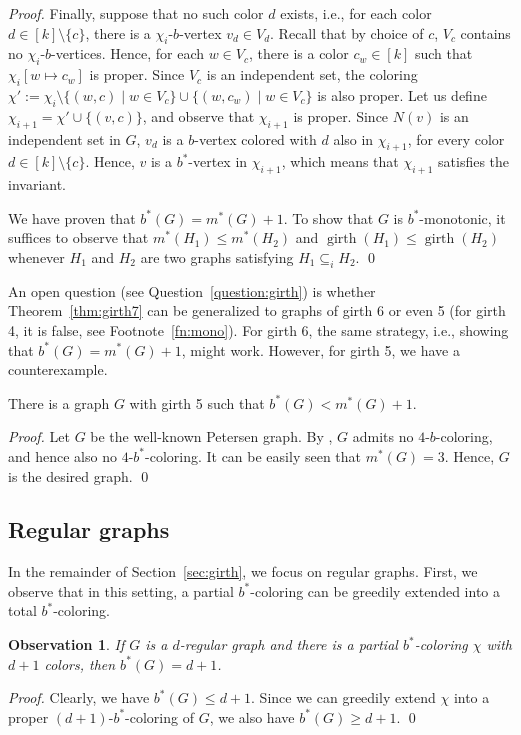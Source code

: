 \documentclass[runningheads, envcountsame]{llncs}
\newcommand{\sep}{\;|\;}
\newcommand{\seq}{\subseteq}
\newtheorem{observation}[theorem]{Observation}
\DeclareMathOperator{\girth}{girth}
\begin{document}
\begin{proof}
Finally, suppose that no such color $d$ exists, i.e., for each color $d \in [k] \setminus \{c\}$, there is a $\chi_i$-$b$-vertex $v_d \in V_d$.
Recall that by choice of $c$, $V_c$ contains no $\chi_i$-$b$-vertices.
Hence, for each $w \in V_c$, there is a color $c_w \in [k]$ such that $\chi_i[w \mapsto c_w]$ is proper.
Since $V_c$ is an independent set, the coloring $\chi' := \chi_i \setminus \{(w, c) \sep w \in V_c\} \cup \{(w, c_w) \sep w \in V_c\}$ is also proper.
Let us define $\chi_{i+1} = \chi' \cup \{(v, c)\}$, and observe that $\chi_{i+1}$ is proper.
Since $N(v)$ is an independent set in $G$, $v_d$ is a $b$-vertex colored with $d$ also in $\chi_{i+1}$, for every color $d \in [k] \setminus \{c\}$.
Hence, $v$ is a $b^*$-vertex in $\chi_{i+1}$, which means that $\chi_{i+1}$ satisfies the invariant.

We have proven that $b^*(G) = m^*(G) + 1$.
To show that $G$ is $b^*$-monotonic, it suffices to observe that $m^*(H_1) \le m^*(H_2)$ and $\girth(H_1) \le \girth(H_2)$ whenever $H_1$ and $H_2$ are two graphs satisfying $H_1 \seq_i H_2$.
\qed\end{proof}

An open question (see Question~\ref{question:girth}) is whether Theorem~\ref{thm:girth7} can be generalized to graphs of girth 6 or even 5 (for girth 4, it is false, see Footnote~\ref{fn:mono}).
For girth 6, the same strategy, i.e., showing that $b^*(G) = m^*(G) + 1$, might work.
However, for girth 5, we have a counterexample.

\begin{proposition}
There is a graph $G$ with girth 5 such that $b^*(G) < m^*(G) + 1$.
\end{proposition}
\begin{proof}
Let $G$ be the well-known Petersen graph.
By \cite[Theorem 1]{BLIDIA20091787}, $G$ admits no $4$-$b$-coloring, and hence also no $4$-$b^*$-coloring.
It can be easily seen that $m^*(G) = 3$.
Hence, $G$ is the desired graph.
\qed\end{proof}

\subsection{Regular graphs}

In the remainder of Section~\ref{sec:girth}, we focus on regular graphs.
First, we observe that in this setting, a partial $b^*$-coloring can be greedily extended into a total $b^*$-coloring.

\begin{observation}\label{obs:finish-regular}
If $G$ is a $d$-regular graph and there is a partial $b^*$-coloring $\chi$ with $d+1$ colors, then $b^*(G) = d +1$.
\end{observation}
\begin{proof}
Clearly, we have $b^*(G) \le d+1$.
Since we can greedily extend $\chi$ into a proper $(d+1)$-$b^*$-coloring of $G$, we also have $b^*(G) \ge d+1$.
\qed\end{proof}
\end{document}
